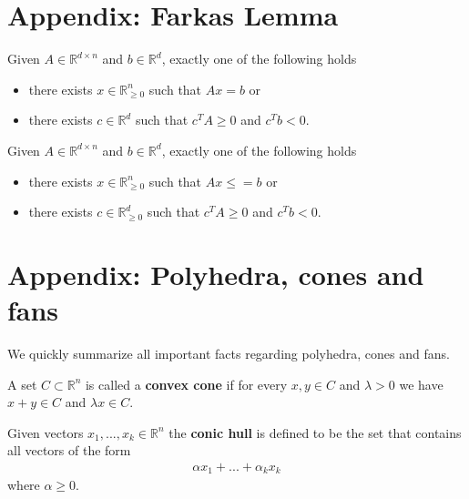 \documentclass[a4paper, 11pt]{article}
\begin{document}
\clearpage
\section{Appendix: Farkas Lemma}

\begin{prop}
  Given \( A \in \mathbb R^{d \times n} \) and \( b \in \mathbb R^d \), exactly one of the following holds 
  \begin{itemize}
    \item there exists \( x \in \mathbb R^n_{\geq 0 }  \) such that \( Ax = b \) or
    \item there exists \( c \in \mathbb R^d \) such that \( c^TA \geq 0 \) and \( c^Tb < 0 \).
  \end{itemize}
\end{prop}

\begin{prop}\label{farkas-2}
  Given \( A \in \mathbb R^{d \times n} \) and \( b \in \mathbb R^d \), exactly one of the following holds 
  \begin{itemize}
    \item there exists \( x \in \mathbb R^n_{\geq 0 }  \) such that \( Ax\leq= b \) or
    \item there exists \( c \in \mathbb R^d_{\geq 0} \) such that \( c^TA \geq 0 \) and \( c^Tb < 0 \).
  \end{itemize}
\end{prop}

\clearpage
\section{Appendix: Polyhedra, cones and fans}

We quickly summarize all important facts regarding polyhedra, cones and fans.

\begin{defi}
  A set \( C \subset \mathbb R^n \) is called a \textbf{convex cone} if for every \( x,y \in C \) and \( \lambda > 0 \) we have \( x+y \in C \) and \( \lambda x \in C \).
\end{defi}

\begin{defi}
  Given vectors \( x_1,...,x_k \in \mathbb R^n \) the \textbf{conic hull} is defined to be the set that contains all vectors of the form 
  \begin{align*}
    \alpha x_1 + ... + \alpha_k x_k 
  \end{align*}
  where \( \alpha \geq 0 \).
\end{defi}
\end{document}
